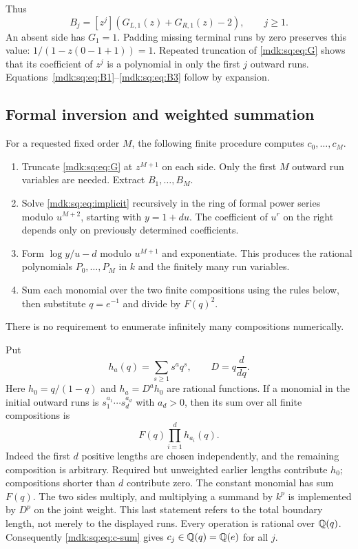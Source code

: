 \documentclass[11pt,letterpaper]{article}
\numberwithin{equation}{section}
\theoremstyle{remark}\newtheorem{remark}[theorem]{Remark}
\begin{document}
Thus
\[
B_j=[z^j](G_{L,1}(z)+G_{R,1}(z)-2),\qquad j\ge1.
\]
An absent side has $G_1=1$. Padding missing terminal runs by zero preserves this value: $1/(1-z(0-1+1))=1$. Repeated truncation of \eqref{mdk:sq:eq:G} shows that its coefficient of $z^j$ is a polynomial in only the first $j$ outward runs. Equations~\eqref{mdk:sq:eq:B1}--\eqref{mdk:sq:eq:B3} follow by expansion.

\subsection{Formal inversion and weighted summation}
For a requested fixed order $M$, the following finite procedure computes $c_0,\ldots,c_M$.
\begin{enumerate}[leftmargin=*,itemsep=0.25em]
\item Truncate \eqref{mdk:sq:eq:G} at $z^{M+1}$ on each side. Only the first $M$ outward run variables are needed. Extract $B_1,\ldots,B_M$.
\item Solve \eqref{mdk:sq:eq:implicit} recursively in the ring of formal power series modulo $u^{M+2}$, starting with $y=1+du$. The coefficient of $u^r$ on the right depends only on previously determined coefficients.
\item Form $\log y/u-d$ modulo $u^{M+1}$ and exponentiate. This produces the rational polynomials $P_0,\ldots,P_M$ in $k$ and the finitely many run variables.
\item Sum each monomial over the two finite compositions using the rules below, then substitute $q=e^{-1}$ and divide by $F(q)^2$.
\end{enumerate}
There is no requirement to enumerate infinitely many compositions numerically.

Put
\[
h_a(q)=\sum_{s\ge1}s^aq^s,\qquad D=q\frac{d}{dq}.
\]
Here $h_0=q/(1-q)$ and $h_a=D^ah_0$ are rational functions. If a monomial in the initial outward runs is $s_1^{a_1}\cdots s_d^{a_d}$ with $a_d>0$, then its sum over all finite compositions is
\begin{equation}\label{mdk:sq:eq:run-sum}
F(q)\prod_{i=1}^d h_{a_i}(q).
\end{equation}
Indeed the first $d$ positive lengths are chosen independently, and the remaining composition is arbitrary. Required but unweighted earlier lengths contribute $h_0$; compositions shorter than $d$ contribute zero. The constant monomial has sum $F(q)$. The two sides multiply, and multiplying a summand by $k^p$ is implemented by $D^p$ on the joint weight. This last statement refers to the total boundary length, not merely to the displayed runs. Every operation is rational over $\mathbb Q(q)$. Consequently \eqref{mdk:sq:eq:c-sum} gives $c_j\in\mathbb Q(q)=\mathbb Q(e)$ for all $j$.
\end{document}
